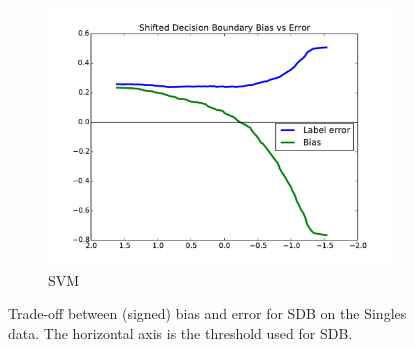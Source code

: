 \documentclass[conference]{IEEEtran}
\begin{document}
\begin{figure}[t]
\begin{subfigure}{.7\columnwidth}
\includegraphics[width=\columnwidth]{images/singles-svm-T.pdf}%
\caption{SVM}%
\label{fig:singles_svm_tradeoff}%
\end{subfigure}%
\caption{Trade-off between (signed) bias and error for SDB on the Singles data. The horizontal axis is the threshold used for SDB.}
\label{fig:singles_tradeoffs}
\end{figure}

\clearpage



\newpage


\end{document}
